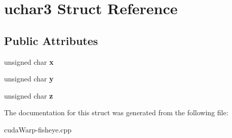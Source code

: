 \hypertarget{structuchar3}{}\section{uchar3 Struct Reference}
\label{structuchar3}
\subsection*{Public Attributes}
\begin{DoxyCompactItemize}
\item 
unsigned char {\bfseries x}\hypertarget{structuchar3_aee96b406614ad2eb817a08099ef02b4a}{}\label{structuchar3_aee96b406614ad2eb817a08099ef02b4a}

\item 
unsigned char {\bfseries y}\hypertarget{structuchar3_ad0de0b141bdc6e91c067489a8c2c3dea}{}\label{structuchar3_ad0de0b141bdc6e91c067489a8c2c3dea}

\item 
unsigned char {\bfseries z}\hypertarget{structuchar3_a4294e55f6a10f888831017a541f55b6e}{}\label{structuchar3_a4294e55f6a10f888831017a541f55b6e}

\end{DoxyCompactItemize}


The documentation for this struct was generated from the following file\+:\begin{DoxyCompactItemize}
\item 
cuda\+Warp-\/fisheye.\+cpp\end{DoxyCompactItemize}
